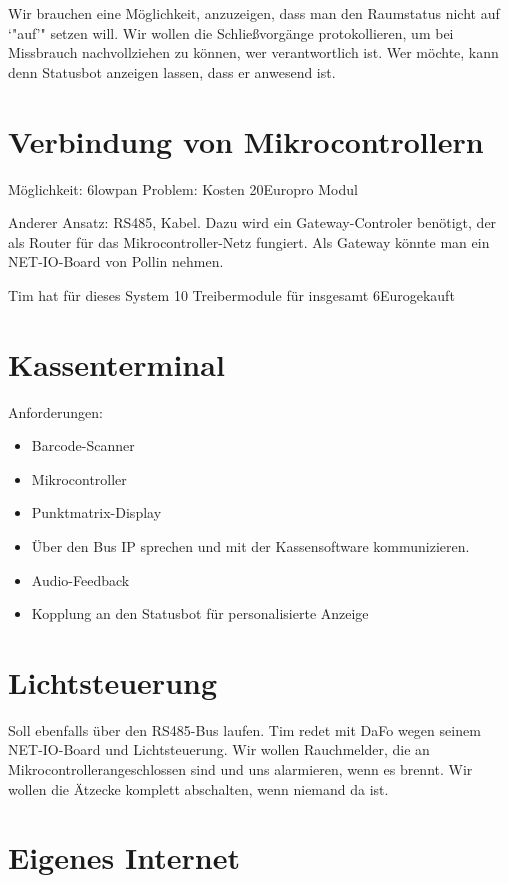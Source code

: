 \documentclass[parskip]{scrartcl}
\newcommand\euro{Euro}
\newcommand\uc{Mikrocontroller}
\begin{document}
Wir brauchen eine Möglichkeit, anzuzeigen, dass man den Raumstatus nicht auf `"auf'" setzen will.
Wir wollen die Schließvorgänge protokollieren, um bei Missbrauch nachvollziehen zu können, wer verantwortlich ist.
Wer möchte, kann denn Statusbot anzeigen lassen, dass er anwesend ist.

\section{Verbindung von Mikrocontrollern}

Möglichkeit: 6lowpan
Problem: Kosten 20\euro pro Modul

Anderer Ansatz: RS485, Kabel. Dazu wird ein Gateway-Controler benötigt, der als Router für das \uc-Netz fungiert.
Als Gateway könnte man ein NET-IO-Board von Pollin nehmen.

Tim hat für dieses System 10 Treibermodule für insgesamt 6\euro gekauft

\section{Kassenterminal}

Anforderungen:
\begin{itemize}
\item{} Barcode-Scanner
\item{} \uc
\item{} Punktmatrix-Display
\item{} Über den Bus IP sprechen und mit der Kassensoftware kommunizieren.
\item{} Audio-Feedback
\item{} Kopplung an den Statusbot für personalisierte Anzeige
\end{itemize}

\section{Lichtsteuerung}

Soll ebenfalls über den RS485-Bus laufen.
Tim redet mit DaFo wegen seinem NET-IO-Board und Lichtsteuerung.
Wir wollen Rauchmelder, die an \uc angeschlossen sind und uns alarmieren, wenn es brennt.
Wir wollen die Ätzecke komplett abschalten, wenn niemand da ist.


\section{Eigenes Internet}
\end{document}
